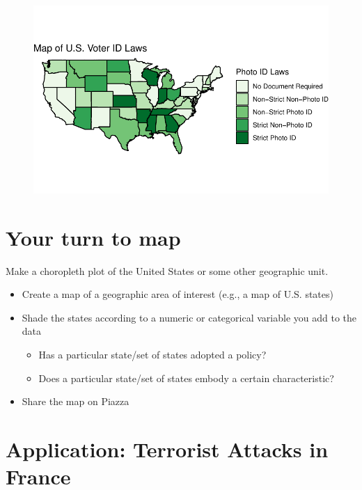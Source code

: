 \documentclass[
  letterpaper,
  DIV=11,
  numbers=noendperiod]{scrreprt}
\providecommand{\tightlist}{%
  \setlength{\itemsep}{0pt}\setlength{\parskip}{0pt}}\usepackage{longtable,booktabs,array}
\begin{document}
\begin{figure}[H]

{\centering \includegraphics{12-Maps_files/figure-pdf/unnamed-chunk-20-1.pdf}

}

\end{figure}

\hypertarget{your-turn-to-map}{%
\section{Your turn to map}\label{your-turn-to-map}}

Make a choropleth plot of the United States or some other geographic
unit.

\begin{itemize}
\tightlist
\item
  Create a map of a geographic area of interest (e.g., a map of U.S.
  states)
\item
  Shade the states according to a numeric or categorical variable you
  add to the data

  \begin{itemize}
  \tightlist
  \item
    Has a particular state/set of states adopted a policy?
  \item
    Does a particular state/set of states embody a certain
    characteristic?
  \end{itemize}
\item
  Share the map on Piazza
\end{itemize}

\hypertarget{application-terrorist-attacks-in-france}{%
\section{Application: Terrorist Attacks in
France}\label{application-terrorist-attacks-in-france}}
\end{document}
